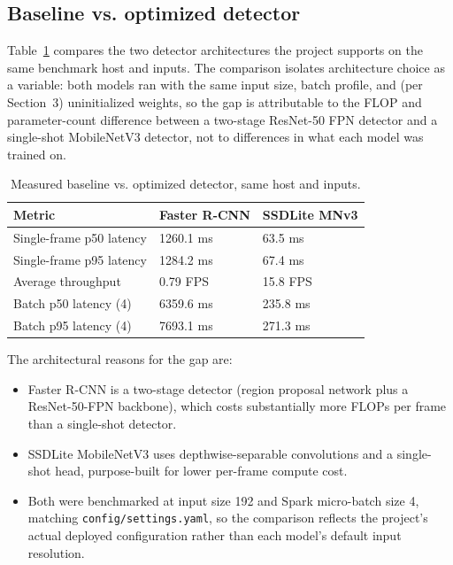 \documentclass[10pt,twocolumn]{article}
\begin{document}
\subsection{Baseline vs. optimized detector}
Table~\ref{tab:before-after} compares the two detector architectures the project supports on the same benchmark host and inputs. The comparison isolates architecture choice as a variable: both models ran with the same input size, batch profile, and (per Section~3) uninitialized weights, so the gap is attributable to the FLOP and parameter-count difference between a two-stage ResNet-50 FPN detector and a single-shot MobileNetV3 detector, not to differences in what each model was trained on.

\begin{table}[t]
\small
\centering
\caption{Measured baseline vs. optimized detector, same host and inputs.}
\label{tab:before-after}
\begin{tabular}{@{}p{}p{}p{}@{}}
\toprule
Metric & Faster R-CNN & SSDLite MNv3 \\
\midrule
Single-frame p50 latency & 1260.1 ms & 63.5 ms \\
Single-frame p95 latency & 1284.2 ms & 67.4 ms \\
Average throughput & 0.79 FPS & 15.8 FPS \\
Batch p50 latency (4) & 6359.6 ms & 235.8 ms \\
Batch p95 latency (4) & 7693.1 ms & 271.3 ms \\
\bottomrule
\end{tabular}
\end{table}

The architectural reasons for the gap are:
\begin{itemize}
  \item Faster R-CNN is a two-stage detector (region proposal network plus a ResNet-50-FPN backbone), which costs substantially more FLOPs per frame than a single-shot detector.
  \item SSDLite MobileNetV3 uses depthwise-separable convolutions and a single-shot head, purpose-built for lower per-frame compute cost.
  \item Both were benchmarked at input size 192 and Spark micro-batch size 4, matching \texttt{config/settings.yaml}, so the comparison reflects the project's actual deployed configuration rather than each model's default input resolution.
\end{itemize}
\end{document}

